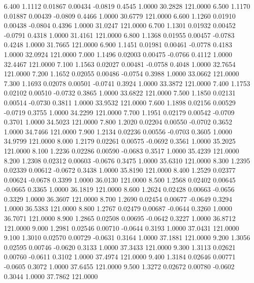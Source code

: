    6.400   1.1112   0.01867   0.00434  -0.0819   0.4545   1.0000  30.2828 121.0000
   6.500   1.1170   0.01887   0.00439  -0.0809   0.4466   1.0000  30.6779 121.0000
   6.600   1.1260   0.01910   0.00438  -0.0804   0.4396   1.0000  31.0247 121.0000
   6.700   1.1301   0.01932   0.00452  -0.0791   0.4318   1.0000  31.4161 121.0000
   6.800   1.1368   0.01955   0.00457  -0.0783   0.4248   1.0000  31.7665 121.0000
   6.900   1.1451   0.01981   0.00461  -0.0778   0.4183   1.0000  32.0924 121.0000
   7.000   1.1496   0.02003   0.00475  -0.0766   0.4112   1.0000  32.4467 121.0000
   7.100   1.1563   0.02027   0.00481  -0.0758   0.4048   1.0000  32.7654 121.0000
   7.200   1.1652   0.02055   0.00486  -0.0754   0.3988   1.0000  33.0662 121.0000
   7.300   1.1693   0.02078   0.00501  -0.0741   0.3924   1.0000  33.3872 121.0000
   7.400   1.1753   0.02102   0.00510  -0.0732   0.3865   1.0000  33.6822 121.0000
   7.500   1.1850   0.02131   0.00514  -0.0730   0.3811   1.0000  33.9532 121.0000
   7.600   1.1898   0.02156   0.00529  -0.0719   0.3755   1.0000  34.2299 121.0000
   7.700   1.1951   0.02179   0.00542  -0.0709   0.3701   1.0000  34.5023 121.0000
   7.800   1.2020   0.02204   0.00550  -0.0702   0.3652   1.0000  34.7466 121.0000
   7.900   1.2134   0.02236   0.00556  -0.0703   0.3605   1.0000  34.9799 121.0000
   8.000   1.2179   0.02261   0.00575  -0.0692   0.3561   1.0000  35.2025 121.0000
   8.100   1.2236   0.02286   0.00590  -0.0683   0.3517   1.0000  35.4239 121.0000
   8.200   1.2308   0.02312   0.00603  -0.0676   0.3475   1.0000  35.6310 121.0000
   8.300   1.2395   0.02339   0.00612  -0.0672   0.3438   1.0000  35.8190 121.0000
   8.400   1.2529   0.02377   0.00624  -0.0678   0.3399   1.0000  36.0130 121.0000
   8.500   1.2568   0.02402   0.00645  -0.0665   0.3365   1.0000  36.1819 121.0000
   8.600   1.2624   0.02428   0.00663  -0.0656   0.3329   1.0000  36.3607 121.0000
   8.700   1.2690   0.02454   0.00677  -0.0649   0.3294   1.0000  36.5383 121.0000
   8.800   1.2767   0.02479   0.00687  -0.0644   0.3260   1.0000  36.7071 121.0000
   8.900   1.2865   0.02508   0.00695  -0.0642   0.3227   1.0000  36.8712 121.0000
   9.000   1.2981   0.02546   0.00710  -0.0644   0.3193   1.0000  37.0431 121.0000
   9.100   1.3010   0.02570   0.00729  -0.0631   0.3164   1.0000  37.1881 121.0000
   9.200   1.3056   0.02595   0.00746  -0.0620   0.3133   1.0000  37.3433 121.0000
   9.300   1.3113   0.02621   0.00760  -0.0611   0.3102   1.0000  37.4974 121.0000
   9.400   1.3184   0.02646   0.00771  -0.0605   0.3072   1.0000  37.6455 121.0000
   9.500   1.3272   0.02672   0.00780  -0.0602   0.3044   1.0000  37.7862 121.0000
